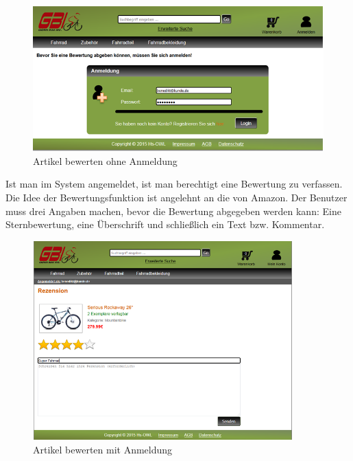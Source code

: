 \begin{figure}[H]
\begin{center}
\includegraphics[width=12cm]{Bilder/Michael_Abbildung11-ArtikelBewertenOhneAnmeldung.png}
\end{center}
\caption{Artikel bewerten ohne Anmeldung}
\end{figure}

Ist man im System angemeldet, ist man berechtigt eine Bewertung zu verfassen.
Die Idee der Bewertungsfunktion ist angelehnt an die von Amazon. Der Benutzer muss drei Angaben machen, bevor die Bewertung abgegeben werden kann: Eine Sternbewertung, eine Überschrift und schließlich ein Text bzw. Kommentar. 

\begin{figure}[H]
\begin{center}
\includegraphics[width=10cm]{Bilder/Michael_Abbildung12-ArtikelBewertenMitAnmeldung.png}
\end{center}
\caption{Artikel bewerten mit Anmeldung}
\end{figure}

